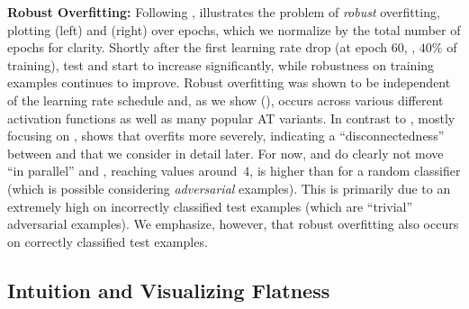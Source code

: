 \textbf{Robust Overfitting:}
%
Following \cite{RiceICML2020},  illustrates the problem of \emph{robust} overfitting, plotting \RCE (left) and \RTE (right) over epochs, which we normalize by the total number of epochs for clarity. Shortly after the first learning rate drop (at epoch $60$, \ie, $40\%$ of training), test \RCE and \RTE start to increase significantly, while robustness on training examples continues to improve.
Robust overfitting was shown to be independent of the learning rate schedule \cite{RiceICML2020} and, as we show (), occurs across various different activation functions as well as many popular AT variants.
In contrast to \cite{RiceICML2020}, mostly focusing on \RTE,  shows that \RCE overfits more severely, indicating a ``disconnectedness'' between \RCE and \RTE that we consider in detail later. For now, \RCE and \RTE do clearly not move ``in parallel'' and \RCE, reaching values around~$4$, is higher than for a random classifier (which is possible considering \emph{adversarial} examples). This is primarily due to an extremely high \RCE on incorrectly classified test examples (which are ``trivial'' adversarial examples). We emphasize, however, that robust overfitting also occurs on correctly classified test examples.

\subsection{Intuition and Visualizing Flatness}
\label{subsec:main-visualization}

